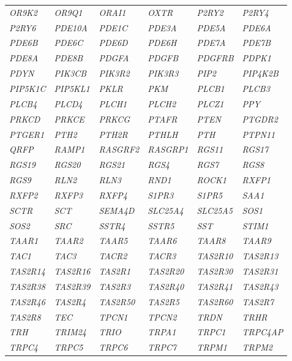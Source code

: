 {\begin{longtable}{>{\em}l>{\em}l>{\em}l>{\em}l>{\em}l>{\em}l}
  \rowcolor{black!10} 
  OR9K2 & OR9Q1 & ORAI1 & OXTR & P2RY2 & P2RY4 \\ 
  \rowcolor{black!5} 
  P2RY6 & PDE10A & PDE1C & PDE3A & PDE5A & PDE6A \\ 
  \rowcolor{black!10} 
  PDE6B & PDE6C & PDE6D & PDE6H & PDE7A & PDE7B \\ 
  \rowcolor{black!5} 
  PDE8A & PDE8B & PDGFA & PDGFB & PDGFRB & PDPK1 \\ 
  \rowcolor{black!10} 
  PDYN & PIK3CB & PIK3R2 & PIK3R3 & PIP2 & PIP4K2B \\ 
  \rowcolor{black!5} 
  PIP5K1C & PIP5KL1 & PKLR & PKM & PLCB1 & PLCB3 \\ 
  \rowcolor{black!10} 
  PLCB4 & PLCD4 & PLCH1 & PLCH2 & PLCZ1 & PPY \\ 
  \rowcolor{black!5} 
  PRKCD & PRKCE & PRKCG & PTAFR & PTEN & PTGDR2 \\ 
  \rowcolor{black!10} 
  PTGER1 & PTH2 & PTH2R & PTHLH & PTH & PTPN11 \\ 
  \rowcolor{black!5} 
  QRFP & RAMP1 & RASGRF2 & RASGRP1 & RGS11 & RGS17 \\ 
  \rowcolor{black!10} 
  RGS19 & RGS20 & RGS21 & RGS4 & RGS7 & RGS8 \\ 
  \rowcolor{black!5} 
  RGS9 & RLN2 & RLN3 & RND1 & ROCK1 & RXFP1 \\ 
  \rowcolor{black!10} 
  RXFP2 & RXFP3 & RXFP4 & S1PR3 & S1PR5 & SAA1 \\ 
  \rowcolor{black!5} 
  SCTR & SCT & SEMA4D & SLC25A4 & SLC25A5 & SOS1 \\ 
  \rowcolor{black!10} 
  SOS2 & SRC & SSTR4 & SSTR5 & SST & STIM1 \\ 
  \rowcolor{black!5} 
  TAAR1 & TAAR2 & TAAR5 & TAAR6 & TAAR8 & TAAR9 \\ 
  \rowcolor{black!10} 
  TAC1 & TAC3 & TACR2 & TACR3 & TAS2R10 & TAS2R13 \\ 
  \rowcolor{black!5} 
  TAS2R14 & TAS2R16 & TAS2R1 & TAS2R20 & TAS2R30 & TAS2R31 \\ 
  \rowcolor{black!10} 
  TAS2R38 & TAS2R39 & TAS2R3 & TAS2R40 & TAS2R41 & TAS2R43 \\ 
  \rowcolor{black!5} 
  TAS2R46 & TAS2R4 & TAS2R50 & TAS2R5 & TAS2R60 & TAS2R7 \\ 
  \rowcolor{black!10} 
  TAS2R8 & TEC & TPCN1 & TPCN2 & TRDN & TRHR \\ 
  \rowcolor{black!5} 
  TRH & TRIM24 & TRIO & TRPA1 & TRPC1 & TRPC4AP \\ 
  \rowcolor{black!10} 
  TRPC4 & TRPC5 & TRPC6 & TRPC7 & TRPM1 & TRPM2 \\ 

\end{longtable}}
